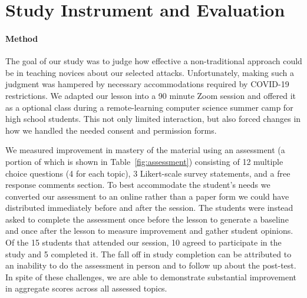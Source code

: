 \section{Study Instrument and Evaluation}
\label{SEC:evaluation}

\paragraph{Method}The goal of our study was to judge how effective a non-traditional approach
could be in teaching novices about our selected attacks.
Unfortunately, making such a judgment was hampered by
necessary accommodations
required by COVID-19 restrictions.
We adapted our lesson into
a 90 minute Zoom session and offered it as a optional class during
a remote-learning computer science summer camp for high school
students.  This not only limited interaction, but also
forced changes in how we handled the needed consent and permission forms.


We measured improvement in mastery
of the material
using
an  assessment (a portion of which is shown in Table~\ref{fig:assessment})
consisting of
12 multiple choice questions (4 for each topic),
3 Likert-scale survey statements,
and a free response comments section.
To best accommodate the student's needs we converted our
assessment to an online rather than a paper form we could have distributed
immediately before and after the session.
The students were instead
asked to complete the assessment once before the lesson to
generate a baseline and once after the lesson to measure improvement
and gather student opinions.
Of the 15 students that attended our session, 10 agreed to participate in
the study and 5 completed it.
The fall off in study completion can be attributed to
an inability to
do the assessment in person and to
follow up about the post-test.  In spite of these
challenges, we are able to demonstrate substantial improvement in aggregate
scores across all assessed topics.







